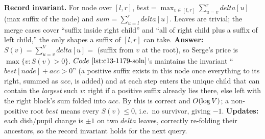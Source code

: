 \begin{proofbox}
\textbf{Record invariant.} For node over \([l,r]\), \(\mathit{best}=\max_{v\in[l,r]}
\sum_{u=v}^{r}\mathit{delta}[u]\) (max suffix of the node) and
\(\mathit{sum}=\sum_{u=l}^{r}\mathit{delta}[u]\).  Leaves are trivial; the merge
cases cover ``suffix inside right child'' and ``all of right child plus a suffix of
left child,'' the only shapes a suffix of \([l,r]\) can take.  \textbf{Answer:}
\(S(v)=\sum_{u=v}^{V}\mathit{delta}[u]=\) (suffix from \(v\) at the root), so Serge's
price is \(\max\{v:S(v)>0\}\).  \(\coderef{c13-1179-soln}\)'s 
maintains the invariant ``\(\mathit{best}[\mathit{node}]+\mathit{acc}>0\)'' (a
positive suffix exists in this node once everything to its right, summed as
\(\mathit{acc}\), is added) and at each step enters the unique child that can
contain the \emph{largest} such \(v\): right if a positive suffix already lies
there, else left with the right block's sum folded into \(\mathit{acc}\).  By
 this is correct and \(O(\log V)\); a non-positive root
\(\mathit{best}\) means every \(S(v)\le0\), i.e.\ no survivor, giving \(-1\).
\textbf{Updates:} each dish/pupil change is \(\pm1\) on two \(\mathit{delta}\)
leaves, correctly re-folding their ancestors, so the record invariant holds for
the next query.
\end{proofbox}

